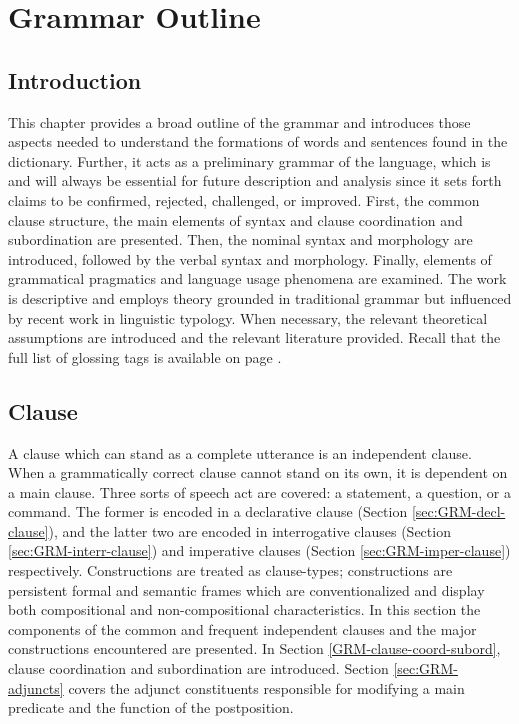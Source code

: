 \chapter{Grammar Outline}
\label{sec:gramsketch}


\section{Introduction}
\label{sec:Introduction}

This chapter  provides a broad outline of the grammar and introduces those 
aspects needed to understand the formations of words and sentences found in 
the 
dictionary. Further, it acts as a preliminary grammar of the language, which is 
and will always be essential for future description and analysis since it sets 
forth claims to be confirmed, rejected, challenged,  or improved.   First, the 
common clause structure, the 
main elements of syntax and clause coordination and subordination are presented. 
Then, the nominal syntax and morphology are introduced,  followed by the verbal 
syntax and morphology. Finally, elements of grammatical pragmatics and language 
usage phenomena are examined.  The work is descriptive and employs theory 
grounded in traditional grammar but  influenced by  recent work in linguistic 
typology. When necessary, the relevant theoretical assumptions are introduced 
and the relevant literature provided. Recall that the full list of glossing tags
is available on page \pageref{sec-ABB}.



\section{Clause}
\label{sec:GRM-nom}

A  clause which can stand as a complete utterance is an independent clause. When 
a grammatically correct clause cannot stand on its own, it is dependent on  a 
main clause.  Three sorts of speech act are covered: a statement, a question, or 
a command. The former is encoded in a declarative clause (Section 
\ref{sec:GRM-decl-clause}), and the latter two are encoded in interrogative 
clauses (Section \ref{sec:GRM-interr-clause}) and imperative clauses  (Section 
\ref{sec:GRM-imper-clause}) respectively.  Constructions are treated as 
clause-types; constructions are persistent formal and semantic frames which are 
conventionalized and display both compositional and non-compositional 
characteristics. In this section  the components of the common and frequent 
independent  clauses and the major constructions encountered are presented.  In 
Section \ref{GRM-clause-coord-subord},  clause coordination and subordination 
are introduced. Section \ref{sec:GRM-adjuncts} covers the adjunct constituents
responsible for modifying a main predicate and the function of the postposition.




